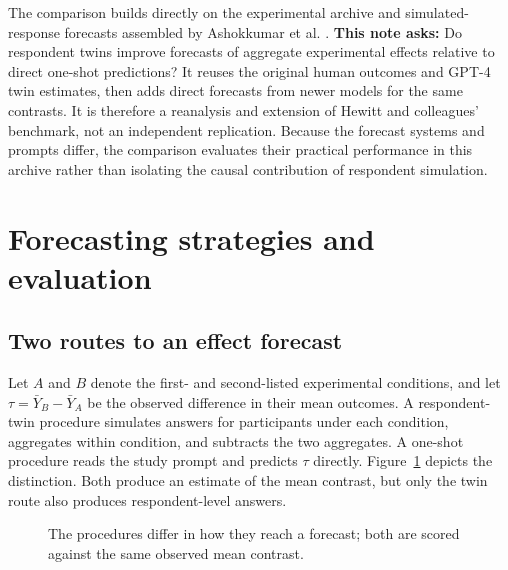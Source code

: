 \documentclass[11pt]{article}
\begin{document}
The comparison builds directly on the experimental archive and simulated-response forecasts assembled by Ashokkumar et al. \citep{ashokkumar2026predict}. \textbf{This note asks:} Do respondent twins improve forecasts of aggregate experimental effects relative to direct one-shot predictions? It reuses the original human outcomes and GPT-4 twin estimates, then adds direct forecasts from newer models for the same contrasts. It is therefore a reanalysis and extension of Hewitt and colleagues' benchmark, not an independent replication. Because the forecast systems and prompts differ, the comparison evaluates their practical performance in this archive rather than isolating the causal contribution of respondent simulation.

\section{Forecasting strategies and evaluation}
\subsection{Two routes to an effect forecast}
Let $A$ and $B$ denote the first- and second-listed experimental conditions, and let $\tau=\bar{Y}_B-\bar{Y}_A$ be the observed difference in their mean outcomes. A respondent-twin procedure simulates answers for participants under each condition, aggregates within condition, and subtracts the two aggregates. A one-shot procedure reads the study prompt and predicts $\tau$ directly. Figure~\ref{fig:paths} depicts the distinction. Both produce an estimate of the mean contrast, but only the twin route also produces respondent-level answers.

\begin{figure}[t]
\centering
{}
\caption{The procedures differ in how they reach a forecast; both are scored against the same observed mean contrast.}
\label{fig:paths}
\end{figure}
\end{document}
